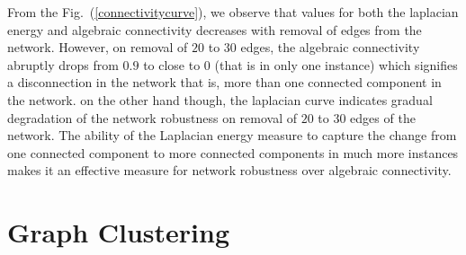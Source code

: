 \documentclass[10pt,a4paper]{article}
\begin{document}
From the Fig.~(\ref{connectivitycurve}), we observe that values for both the laplacian energy and algebraic connectivity decreases with removal of edges from the network. However, on removal of $20$ to $30$ edges, the algebraic connectivity abruptly drops from $0.9$ to close to $0$ (that is in only one instance) which signifies a disconnection in the network that is, more than one connected component in the network. on the other hand though, the laplacian curve indicates gradual degradation of the network robustness on removal of $20$ to $30$ edges of the network. The ability of the Laplacian energy measure to capture the change from one connected component to more connected components in much more instances makes it an effective measure for network robustness over algebraic connectivity.


\section{Graph Clustering}
\end{document}
